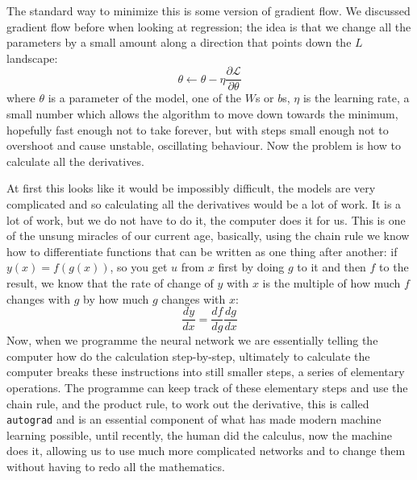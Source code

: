 \documentclass[12pt]{article}
\begin{document}
The standard way to minimize this is some version of gradient flow. We
discussed gradient flow before when looking at regression; the idea is
that we change all the parameters by a small amount along a direction
that points down the $L$ landscape:
\begin{equation}
  \theta\leftarrow\theta-\eta\frac{\partial \mathcal{L}}{\partial \theta}
\end{equation}
where $\theta$ is a parameter of the model, one of the $W$s or $b$s,
$\eta$ is the learning rate, a small number which allows the algorithm
to move down towards the minimum, hopefully fast enough not to take
forever, but with steps small enough not to overshoot and cause
unstable, oscillating behaviour. Now the problem is how to calculate
all the derivatives.

At first this looks like it would be impossibly difficult, the models
are very complicated and so calculating all the derivatives would be a
lot of work. It is a lot of work, but we do not have to do it, the
computer does it for us. This is one of the unsung miracles of our
current age, basically, using the chain rule we know how to
differentiate functions that can be written as one thing after
another: if $y(x)=f(g(x))$, so you get $u$ from $x$ first by doing $g$
to it and then $f$ to the result, we know that the rate of change of
$y$ with $x$ is the multiple of how much $f$ changes with $g$ by how
much $g$ changes with $x$:
\begin{equation}
  \frac{dy}{dx}=\frac{df}{dg}\frac{dg}{dx}
\end{equation}
Now, when we programme the neural network we are essentially telling
the computer how do the calculation step-by-step, ultimately to
calculate the computer breaks these instructions into still smaller
steps, a series of elementary operations. The programme can keep track
of these elementary steps and use the chain rule, and the product
rule, to work out the derivative, this is called \texttt{autograd} and
is an essential component of what has made modern machine learning
possible, until recently, the human did the calculus, now the machine
does it, allowing us to use much more complicated networks and to
change them without having to redo all the mathematics.
\end{document}
